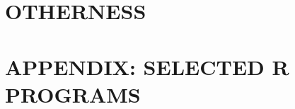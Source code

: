 \documentclass{BGSU}
\numberwithin{equation}{chapter}
\begin{document}
\chapter{\texorpdfstring{OTHERNESS}{}}


\backmatter







\mbox{}\newpage
{}
\appendix
\chapter{\texorpdfstring{APPENDIX: SELECTED R PROGRAMS}{APPENDIX}}

\end{document}
